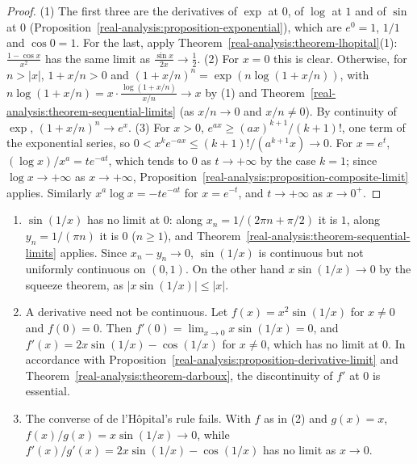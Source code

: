 \begin{proof}
(1) The first three are the derivatives of $\exp$ at $0$, of $\log$ at $1$ and of $\sin$ at $0$ (Proposition~\ref{real-analysis:proposition-exponential}), which are $e^0 = 1$, $1/1$ and $\cos 0 = 1$. For the last, apply
Theorem~\ref{real-analysis:theorem-lhopital}(1): $\frac{1 - \cos x}{x^2}$ has the same limit as $\frac{\sin x}{2x} \to \frac12$.
(2) For $x = 0$ this is clear. Otherwise, for $n > |x|$, $1 + x/n > 0$ and $(1 + x/n)^n = \exp(n\log(1 + x/n))$, with $n\log(1 + x/n) = x\cdot\frac{\log(1 + x/n)}{x/n} \to x$ by (1) and
Theorem~\ref{real-analysis:theorem-sequential-limits} (as $x/n \to 0$ and $x/n \neq 0$). By continuity of $\exp$, $(1 + x/n)^n \to e^x$.
(3) For $x > 0$, $e^{ax} \geq (ax)^{k+1}/(k+1)!$, one term of the exponential series, so $0 < x^ke^{-ax} \leq (k+1)!/(a^{k+1}x) \to 0$. For $x = e^t$, $(\log x)/x^a = te^{-at}$, which tends to $0$ as $t \to +\infty$ by the
case $k = 1$; since $\log x \to +\infty$ as $x \to +\infty$, Proposition~\ref{real-analysis:proposition-composite-limit} applies. Similarly $x^a\log x = -te^{-at}$ for $x = e^{-t}$, and $t \to +\infty$ as $x \to 0^+$.
\end{proof}

\begin{counterexample}\label{real-analysis:counterexample-sin-one-over-x}
\begin{enumerate}
\item $\sin(1/x)$ has no limit at $0$: along $x_n = 1/(2\pi n + \pi/2)$ it is $1$, along $y_n = 1/(\pi n)$ it is $0$ ($n \geq 1$), and Theorem~\ref{real-analysis:theorem-sequential-limits} applies. Since
$x_n - y_n \to 0$, $\sin(1/x)$ is continuous but not uniformly continuous on $(0, 1)$. On the other hand $x\sin(1/x) \to 0$ by the squeeze theorem, as $|x\sin(1/x)| \leq |x|$.
\item A derivative need not be continuous. Let $f(x) = x^2\sin(1/x)$ for $x \neq 0$ and $f(0) = 0$. Then $f'(0) = \lim_{x \to 0}x\sin(1/x) = 0$, and $f'(x) = 2x\sin(1/x) - \cos(1/x)$ for $x \neq 0$, which has no limit at $0$.
In accordance with Proposition~\ref{real-analysis:proposition-derivative-limit} and Theorem~\ref{real-analysis:theorem-darboux}, the discontinuity of $f'$ at $0$ is essential.
\item The converse of de l'H\^opital's rule fails. With $f$ as in (2) and $g(x) = x$, $f(x)/g(x) = x\sin(1/x) \to 0$, while $f'(x)/g'(x) = 2x\sin(1/x) - \cos(1/x)$ has no limit as $x \to 0$.
\end{enumerate}
\end{counterexample}

